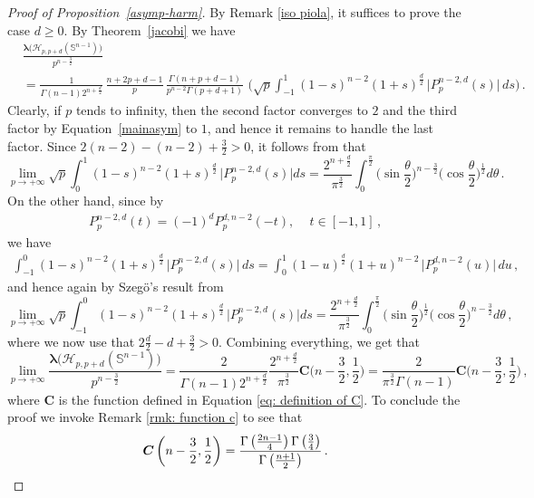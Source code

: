\documentclass[12pt]{amsart}
\numberwithin{subsection}{section}
\theoremstyle{definition}
\theoremstyle{remark}
\begin{document}
\begin{proof}[Proof of Proposition~\ref{asymp-harm}]
By Remark \ref{iso piola}, it suffices to prove the case $d\ge 0.$
By Theorem~\ref{jacobi} we have
\begin{align*}
&
\frac{\boldsymbol{\lambda}\big(\mathcal{H}_{p,p+d}(\mathbb{S}^{n-1})\big)}{p^{n-\frac{3}{2}}}
\\&
=
\frac{1}{\Gamma(n-1) 2^{n + \frac{d}{2}}}
\,
\frac{n+2p +d-1}{p }
\,
\frac{\Gamma(n + p + d - 1)}{ p^{n-2} \Gamma(p+d +1)  }
\,\,
\bigg(
  \sqrt{p} \int_{-1}^{1} (1-s)^{n-2} (1+s)^{\frac{d}{2}} \,\big| P_{p}^{n-2,d}(s)\big|\,ds
 \bigg)\,.
  \end{align*}
Clearly, if  $p $ tends to infinity, then the second factor converges to  $2 $ and  the third factor by Equation~\eqref{mainasym}
to  $1 $, and hence it remains to handle the last factor.
Since  $2(n-2) - (n-2) + \frac{3}{2} > 0 $, it follows from   \cite[§19, Equation (6), p. 84]{szeg1933Asymptotische}  that
\[
\lim_{p\to + \infty} \sqrt{p} \int_{0}^{1} (1-s)^{n-2} (1+s)^{\frac{d}{2}} \,\big| P_{p}^{n-2,d}(s)\big| ds =
\frac{2^{n+\frac{d}{2}}}{\pi^{\frac{3}{2}}}
\int_{0}^{\frac{\pi}{2}} \big(\sin \frac{\theta}{2}\big)^{n-\frac{3}{2}} \big(\cos \frac{\theta}{2}\big)^{\frac{1}{2}}d\theta\,.
\]
 On the other hand, since by
        \cite[ 4.1.3, p.~59]{szeg1939orthogonal}
       \begin{align*} \label{SZ1}
      P_p^{n-2, d} (t) = (-1)^d P_p^{d,n-2} (-t), \quad\, t\in [-1, 1]\,,
    \end{align*}
we have
\begin{align*}
  \int_{-1}^{0} (1-s)^{n-2} (1+s)^{\frac{d}{2}} \,\big| P_{p}^{n-2,d}(s)\big|\,ds
  =
  \int_{0}^{1} (1-u)^{\frac{d}{2}}(1+u)^{n-2}  \,\big| P_{p}^{d,n-2}(u)\big|\,du\,,
\end{align*}
and hence again by Szeg\"o's result from \cite[§19, Equation (6), p. 84]{szeg1933Asymptotische}
\[
\lim_{p\to + \infty} \sqrt{p} \int_{-1}^{0} (1-s)^{n-2} (1+s)^{\frac{d}{2}} \,\big| P_{p}^{n-2,d}(s)\big| ds =
\frac{2^{n+\frac{d}{2}}}{\pi^{\frac{3}{2}}}
\int_{0}^{\frac{\pi}{2}} \big(\sin \frac{\theta}{2}\big)^{\frac{1}{2}}\big(\cos \frac{\theta}{2}\big)^{n-\frac{3}{2}} d\theta\,,
\]
where we now use that  $2 \frac{d}{2} - d + \frac{3}{2} > 0 $. Combining everything, we get that
\[
\lim_{p \to + \infty}  \frac{\boldsymbol{\lambda}\big(\mathcal{H}_{p,p+d}(\mathbb{S}^{n-1})\big)}{p^{n- \frac{3}{2}}}
= \frac{2}{\Gamma(n-1) 2^{n + \frac{d}{2}}}  \frac{2^{n+\frac{d}{2}}}{\pi^{\frac{3}{2}}} \boldsymbol{C}\Big(n-\frac{3}{2},\frac{1}{2}\Big)
=
\frac{2 }{\pi^{\frac{3}{2}}\Gamma(n-1)} \boldsymbol{C}\Big(n-\frac{3}{2},\frac{1}{2}\Big)\,,
\]
where $\boldsymbol{C}$ is the function defined in Equation \eqref{eq: definition of C}.
To conclude the proof we invoke Remark \ref{rmk: function c} to see that
\[
\boldsymbol{C}\left(n - \frac{3}{2}, \frac{1}{2}\right) =  \frac{\Gamma\left(\frac{2n-1}{4}\right)
\Gamma\left(\frac{3}{4}\right)}{\Gamma\left(\frac{n + 1}{2}\right)}\,. \qedhere
\]
\end{proof}
\end{document}
